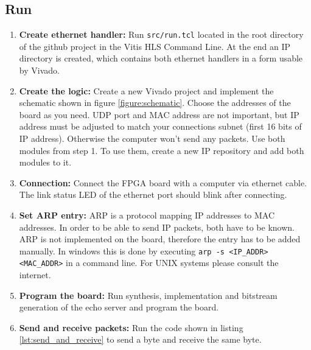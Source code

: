 \subsection{Run}
\begin{enumerate}
  \item \textbf{Create ethernet handler:} Run \texttt{src/run.tcl} located in the root directory of the github project in the Vitis HLS Command Line. At the end an IP directory is created, which contains both ethernet handlers in a form usable by Vivado.
  \item \textbf{Create the logic:} Create a new Vivado project and implement the schematic shown in figure \ref{figure:schematic}. Choose the addresses of the board as you need. UDP port and MAC address are not important, but IP address must be adjusted to match your connections subnet (first 16 bits of IP address). Otherwise the computer won't send any packets. Use both modules from step 1. To use them, create a new IP repository and add both modules to it.
  \item \textbf{Connection:} Connect the FPGA board with a computer via ethernet cable. The link status LED of the ethernet port should blink after connecting.
  \item \textbf{Set ARP entry:} ARP is a protocol mapping IP addresses to MAC addresses. In order to be able to send IP packets, both have to be known. ARP is not implemented on the board, therefore the entry has to be added manually. In windows this is done by executing \texttt{arp -s <IP\_ADDR> <MAC\_ADDR>} in a command line. For UNIX systems please consult the internet.
  \item \textbf{Program the board:} Run synthesis, implementation and bitstream generation of the echo server and program the board.
  \item \textbf{Send and receive packets:} Run the code shown in listing \ref{lst:send_and_receive} to send a byte and receive the same byte.
\end{enumerate}
